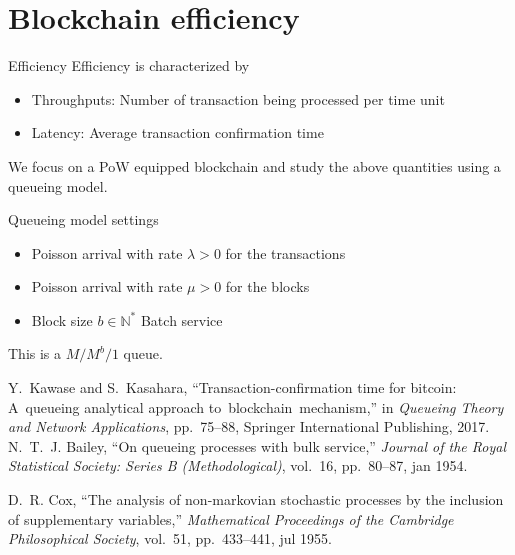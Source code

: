 \documentclass{beamer}
\begin{document}
\section{Blockchain efficiency}
\begin{frame}{Efficiency}
Efficiency is characterized by 
\begin{itemize}
  \item Throughputs: Number of transaction being processed per time unit
  \item Latency: Average transaction confirmation time
\end{itemize}
We focus on a PoW equipped blockchain and study the above quantities using a queueing model.
\end{frame}
\begin{frame}{Queueing model settings}
\begin{itemize}
\item Poisson arrival with rate $\lambda>0$ for the transactions
\item Poisson arrival with rate $\mu>0$ for the blocks 
\item Block size $b\in\mathbb{N}^\ast$
Batch service
\end{itemize}
This is a $M/M^b/1$ queue.
\tiny
\begin{thebibliography}{1}
Y.~Kawase and S.~Kasahara, ``Transaction-confirmation time for bitcoin:
  A~queueing analytical approach to~blockchain~mechanism,'' in {\em Queueing
  Theory and Network Applications}, pp.~75--88, Springer International
  Publishing, 2017.
N.~T.~J. Bailey, ``On queueing processes with bulk service,'' {\em Journal of
  the Royal Statistical Society: Series B (Methodological)}, vol.~16,
  pp.~80--87, jan 1954.

D.~R. Cox, ``The analysis of non-markovian stochastic processes by the
  inclusion of supplementary variables,'' {\em Mathematical Proceedings of the
  Cambridge Philosophical Society}, vol.~51, pp.~433--441, jul 1955.

\end{thebibliography}
\end{frame}
\end{document}
